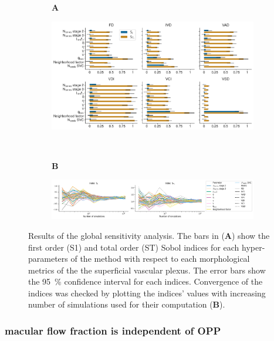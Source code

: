 \documentclass[11pt,]{article}
\begin{document}
\begin{figure}[ht!]
  \centering
  \begin{subfigure}[t]{.03\textwidth}
    \textbf{A}
  \end{subfigure}
  \begin{subfigure}[t]{.95\textwidth}
    \includegraphics[width=\textwidth, valign=t]{SobolIndices}
  \end{subfigure}
  \\
  \begin{subfigure}[t]{.03\textwidth}
    \textbf{B}
  \end{subfigure}
  \begin{subfigure}[t]{.95\textwidth}
    \includegraphics[width=\textwidth, valign=t]{ConvergenceSobolIndices}
  \end{subfigure}
  \caption{Results of the global sensitivity analysis. The bars in (\textbf{A}) show the first order (S1) and total order (ST) Sobol indices for each hyper-parameters of the method with respect to each morphological metrics of the the superficial vascular plexus. 
    The error bars show the \SI{95}{\%} confidence interval for each indices. Convergence of the indices was checked by plotting the indices' values with increasing number of simulations used for their computation (\textbf{B}).}
  \label{fig:gsa}
\end{figure}

\subsubsection{macular flow fraction is independent of OPP}\label{sec:UQ}
\end{document}
